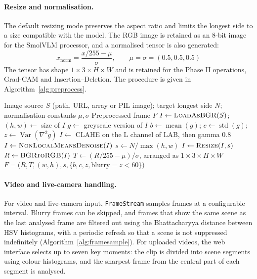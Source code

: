 \documentclass[12pt,a4paper,oneside]{report}
\newcommand{\code}[1]{\texttt{#1}}
\begin{document}
\paragraph{Resize and normalisation.} The default resizing mode preserves the
aspect ratio and limits the longest side to a size compatible with the model.
The RGB image is retained as an 8-bit image for the SmolVLM processor, and a
normalised tensor is also generated:
\begin{equation}
  x_{\text{norm}} = \frac{x/255 - \mu}{\sigma}, \qquad
  \mu = \sigma = (0.5, 0.5, 0.5)
  \label{eq:norm}
\end{equation}
The tensor has shape $1 \times 3 \times H \times W$ and is retained for the
Phase II operations, Grad-CAM and Insertion--Deletion. The procedure is given in
Algorithm~\ref{alg:preprocess}.

\begin{algorithm}[htbp]
\caption{Input preprocessing}
\label{alg:preprocess}
\begin{algorithmic}[1]
\Require Image source $S$ (path, URL, array or PIL image); target longest side $N$; normalisation constants $\mu,\sigma$
\Ensure Preprocessed frame $F$
\State $I \gets \textsc{LoadAsBGR}(S)$;\; $(h,w) \gets$ size of $I$
\State $g \gets$ greyscale version of $I$
\State $b \gets \operatorname{mean}(g)$;\; $c \gets \operatorname{std}(g)$;\; $z \gets \operatorname{Var}(\nabla^2 g)$ 
  \State $I \gets$ CLAHE on the L channel of LAB, then gamma $0.8$
\EndIf
{}
  \State $I \gets \textsc{NonLocalMeansDenoise}(I)$
\EndIf
\State $s \gets N / \max(h,w)$
  \State $I \gets \textsc{Resize}(I, s)$ 
\EndIf
\State $R \gets \textsc{BGRtoRGB}(I)$
\State $T \gets (R/255 - \mu)/\sigma$, arranged as $1 \times 3 \times H \times W$
\State \Return $F = \big(R, T, (w,h), s, \{b, c, z, \text{blurry} = z < 60\}\big)$
\end{algorithmic}
\end{algorithm}

\paragraph{Video and live-camera handling.} For video and live-camera input,
\code{FrameStream} samples frames at a configurable interval. Blurry frames can
be skipped, and frames that show the same scene as the last analysed frame are
filtered out using the Bhattacharyya distance between HSV histograms, with a
periodic refresh so that a scene is not suppressed indefinitely
(Algorithm~\ref{alg:framesample}). For uploaded videos, the web interface
selects up to seven key moments: the clip is divided into scene segments using
colour histograms, and the sharpest frame from the central part of each segment
is analysed.
\end{document}
